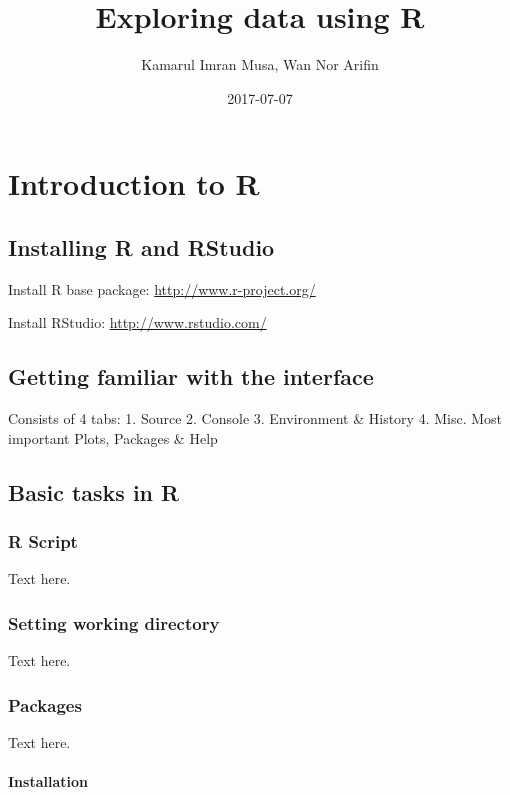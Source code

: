 \documentclass[]{book}
\title{Exploring data using R}
\author{Kamarul Imran Musa, Wan Nor Arifin}
\date{2017-07-07}
\theoremstyle{definition}
\theoremstyle{definition}
\theoremstyle{remark}
\begin{document}
\maketitle

{
\setcounter{tocdepth}{1}
\tableofcontents
}
\chapter{Introduction to R}\label{introduction-to-r}

\section{Installing R and RStudio}\label{installing-r-and-rstudio}

Install R base package: \url{http://www.r-project.org/}

Install RStudio: \url{http://www.rstudio.com/}

\section{Getting familiar with the
interface}\label{getting-familiar-with-the-interface}

Consists of 4 tabs: 1. Source 2. Console 3. Environment \& History 4.
Misc. Most important Plots, Packages \& Help

\section{Basic tasks in R}\label{basic-tasks-in-r}

\subsection{R Script}\label{r-script}

Text here.

\subsection{Setting working directory}\label{setting-working-directory}

Text here.

\subsection{Packages}\label{packages}

Text here.

\subsubsection{Installation}\label{installation}
\end{document}
